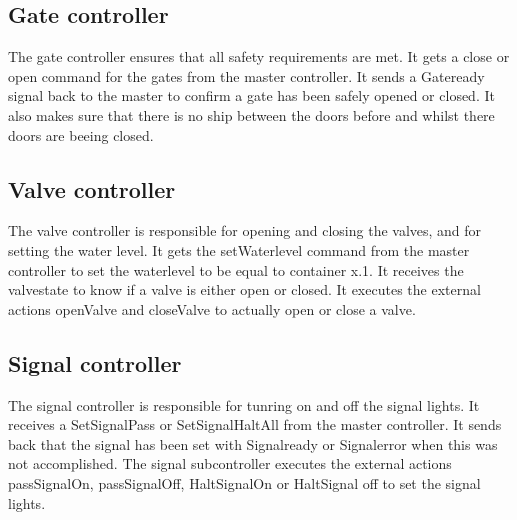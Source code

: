 \subsection{Gate controller}
The gate controller ensures that all safety requirements are met. It gets a close or open command for the gates from the master controller. It sends a Gateready signal back to the master to confirm a gate has been safely opened or closed. It also makes sure that there is no ship between the doors before and whilst there doors are beeing closed.
\subsection{Valve controller}
The valve controller is responsible for opening and closing the valves, and for setting the water level. It  gets the setWaterlevel command from the master controller to set the waterlevel to be equal to container x.1. It receives the valvestate to know if a valve is either open or closed. It executes the external actions openValve and closeValve to actually open or close a valve.
\subsection{Signal controller}
The signal controller is responsible for tunring on and off the signal lights. It receives a SetSignalPass or SetSignalHaltAll from the master controller. It sends back that the signal has been set with Signalready or Signalerror when this was not accomplished. The signal subcontroller executes the external actions passSignalOn, passSignalOff, HaltSignalOn or HaltSignal off to set the signal lights. 